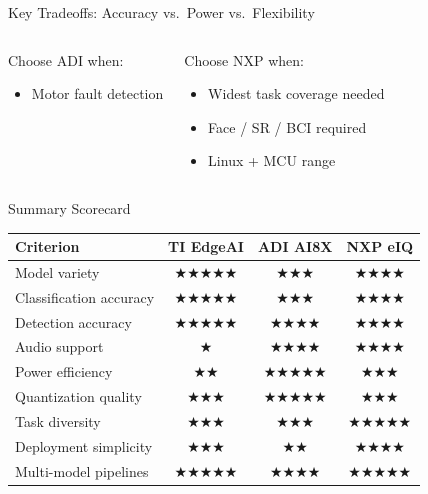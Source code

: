 \documentclass[aspectratio=169]{beamer}
\newcommand{\tibox}[1]{\colorbox{TIRed!15}{\textcolor{TIRed}{\textbf{#1}}}}
\newcommand{\adibox}[1]{\colorbox{ADIBlue!15}{\textcolor{ADIBlue}{\textbf{#1}}}}
\newcommand{\nxpbox}[1]{\colorbox{NXPOrange!15}{\textcolor{NXPOrange}{\textbf{#1}}}}
\begin{document}
\begin{frame}{Key Tradeoffs: Accuracy vs.\ Power vs.\ Flexibility}
\begin{columns}
\begin{block}{Choose \textcolor{ADIBlue}{ADI} when:}
\begin{itemize}
  \item Motor fault detection
\end{itemize}
\end{block}
\begin{block}{Choose \textcolor{NXPOrange}{NXP} when:}
\begin{itemize}
  \item Widest task coverage needed
  \item Face / SR / BCI required
  \item Linux + MCU range
\end{itemize}
\end{block}
\end{columns}
\end{frame}

\begin{frame}{Summary Scorecard}
\begin{center}
\small
\begin{tabular}{lccc}
\toprule
\textbf{Criterion} & \tibox{TI EdgeAI} & \adibox{ADI AI8X} & \nxpbox{NXP eIQ}\\
\midrule
Model variety & $\bigstar\bigstar\bigstar\bigstar\bigstar$ & $\bigstar\bigstar\bigstar$ & $\bigstar\bigstar\bigstar\bigstar$\\
Classification accuracy & $\bigstar\bigstar\bigstar\bigstar\bigstar$ & $\bigstar\bigstar\bigstar$ & $\bigstar\bigstar\bigstar\bigstar$\\
Detection accuracy & $\bigstar\bigstar\bigstar\bigstar\bigstar$ & $\bigstar\bigstar\bigstar\bigstar$ & $\bigstar\bigstar\bigstar\bigstar$\\
Audio support & $\bigstar$ & $\bigstar\bigstar\bigstar\bigstar$ & $\bigstar\bigstar\bigstar\bigstar$\\
Power efficiency & $\bigstar\bigstar$ & $\bigstar\bigstar\bigstar\bigstar\bigstar$ & $\bigstar\bigstar\bigstar$\\
Quantization quality & $\bigstar\bigstar\bigstar$ & $\bigstar\bigstar\bigstar\bigstar\bigstar$ & $\bigstar\bigstar\bigstar$\\
Task diversity & $\bigstar\bigstar\bigstar$ & $\bigstar\bigstar\bigstar$ & $\bigstar\bigstar\bigstar\bigstar\bigstar$\\
Deployment simplicity & $\bigstar\bigstar\bigstar$ & $\bigstar\bigstar$ & $\bigstar\bigstar\bigstar\bigstar$\\
Multi-model pipelines & $\bigstar\bigstar\bigstar\bigstar\bigstar$ & $\bigstar\bigstar\bigstar\bigstar$ & $\bigstar\bigstar\bigstar\bigstar\bigstar$\\

\end{tabular}
\end{center}
\end{frame}
\end{document}
